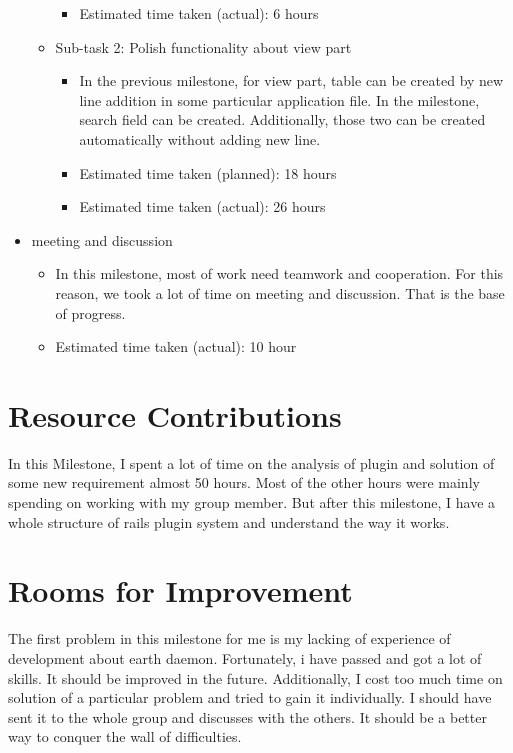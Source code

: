 \begin{itemize}
\begin{itemize}
\begin{itemize}
                    \item Estimated time taken (actual): 6 hours
                \end{itemize}
            \item Sub-task 2: Polish functionality about view part
                \begin{itemize}
                    \item In the previous milestone, for view part, table can be created by new line addition in some particular application file. In the milestone, search field can be created. Additionally, those two can be created automatically without adding new line.		
                    \item Estimated time taken (planned): 18 hours
                    \item Estimated time taken (actual): 26 hours
                \end{itemize}
        \end{itemize}
    \item meeting and discussion
        \begin{itemize}
            \item In this milestone, most of work need teamwork and cooperation. For this reason, we took a lot of time on meeting and discussion. That is the base of progress.
            \item Estimated time taken (actual): 10 hour
        \end{itemize}
\end{itemize}

\section*{Resource Contributions}

In this Milestone, I spent a lot of time on the analysis of plugin and solution of some new requirement almost 50 hours. Most of the other hours were mainly spending on working with my group member. But after this milestone, I have a whole structure of rails plugin system and understand the way it works.

\section*{Rooms for Improvement}


The first problem in this milestone for me is my lacking of experience of development about earth daemon. Fortunately, i have passed and got a lot of skills. It should be improved in the future. Additionally, I cost too much time on solution of a particular problem and tried to gain it individually. I should have sent it to the whole group and discusses with the others. It should be a better way to conquer the wall of difficulties.
